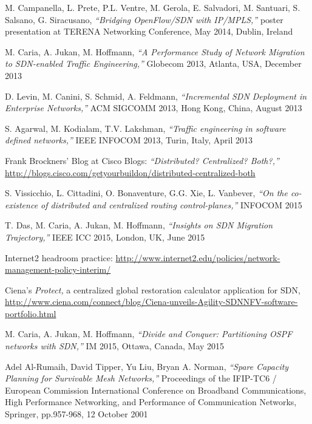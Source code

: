 \documentclass[10pt, conference]{IEEEtran}
\begin{document}
\begin{thebibliography}{1}

 M. Campanella, L. Prete, P.L. Ventre, M. Gerola, E. Salvadori, M. Santuari, S. Salsano, G. Siracusano, \emph{``Bridging OpenFlow/SDN with IP/MPLS,''} poster presentation at TERENA Networking Conference, May 2014, Dublin, Ireland

 M. Caria, A. Jukan, M. Hoffmann, \emph{``A Performance Study of Network Migration to SDN-enabled Traffic Engineering,''} Globecom 2013, Atlanta, USA, December 2013

 D. Levin, M. Canini, S. Schmid, A. Feldmann, \emph{``Incremental SDN Deployment in Enterprise Networks,''} ACM SIGCOMM 2013, Hong Kong, China, August 2013

 S. Agarwal, M. Kodialam, T.V. Lakshman, \emph{``Traffic engineering in software defined networks,''} IEEE INFOCOM 2013, Turin, Italy, April 2013

 Frank Brockners' Blog at Cisco Blogs: \emph{``Distributed? Centralized? Both?,''} \url{http://blogs.cisco.com/getyourbuildon/distributed-centralized-both}

 S. Vissicchio, L. Cittadini, O. Bonaventure, G.G. Xie, L. Vanbever, \emph{``On the co-existence of distributed and centralized routing control-planes,''} INFOCOM 2015

 T. Das, M. Caria, A. Jukan, M. Hoffmann, \emph{``Insights on SDN Migration Trajectory,''} IEEE ICC 2015, London, UK, June 2015

 Internet2 headroom practice: 
\url{http://www.internet2.edu/policies/network-management-policy-interim/}

 Ciena's \emph{Protect,} a centralized global restoration calculator application for SDN,
\url{http://www.ciena.com/connect/blog/Ciena-unveils-Agility-SDNNFV-software-portfolio.html}

 M. Caria, A. Jukan, M. Hoffmann, \emph{``Divide and Conquer: Partitioning OSPF networks with SDN,''} IM 2015, Ottawa, Canada, May 2015

 Adel Al-Rumaih, David Tipper, Yu Liu, Bryan A. Norman, \emph{``Spare Capacity Planning for Survivable Mesh Networks,''} Proceedings of the IFIP-TC6 / European Commission International Conference on Broadband Communications, High Performance Networking, and Performance of Communication Networks, Springer, pp.957-968, 12 October 2001


\end{thebibliography}
\end{document}
